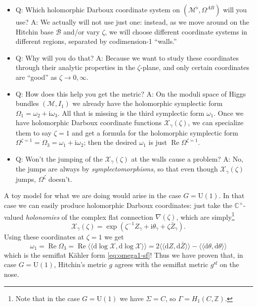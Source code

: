 \documentclass[12pt,letterpaper,reqno]{article}
\numberwithin{equation}{section}
\newcommand{\cB}{\ensuremath{\mathcal B}}
\newcommand{\cM}{\ensuremath{\mathcal M}}
\newcommand{\cX}{\ensuremath{\mathcal X}}
\newcommand{\C}{\ensuremath{\mathbb C}}
\newcommand{\Z}{\ensuremath{\mathbb Z}}
\newcommand{\kahler}{K\"ahler\xspace}
\newcommand{\I}{{\mathrm i}}
\newcommand{\de}{\mathrm{d}}
\renewcommand{\sf}{\mathrm{sf}}
\newcommand{\DIP}[1]{\langle\!\langle#1\rangle\!\rangle}
\newcommand{\ti}[1]{\textit{#1}}
\DeclareMathOperator{\re}{Re}
\newcommand{\U}{\mathrm{U}}
\newcommand{\insfig}[2]{

\medskip
\noindent
\begin{minipage}{\linewidth}

\makebox[\linewidth]{\texttt{[image: figures/\#1-crop.pdf]}}

\end{minipage}
\medskip

}
\begin{document}
\begin{itemize}
\item Q: Which holomorphic Darboux coordinate system on
$(\cM^\flat, \Omega^{AB})$ will you use? A: We actually
will not use just one: instead, as we move around on the
Hitchin base $\cB$ and/or vary $\zeta$, 
we will choose different coordinate
systems in different regions, separated by codimension-1 ``walls.''

\insfig{higgs-metric-6}{0.8}

\item Q: Why will you do that? A: Because we want to study
these coordinates through their analytic properties in the
$\zeta$-plane, and only certain coordinates are ``good''
as $\zeta \to 0, \infty$.


\item Q: How does this help you get the metric? A: On the
moduli space of Higgs bundles $(\cM, I_1)$ we 
already have the holomorphic
symplectic form $\Omega_1 = \omega_2 + \I \omega_3$. All that
is missing is the third symplectic form $\omega_1$.
Once we have holomorphic Darboux coordinate functions $\cX_\gamma(\zeta)$,
we can specialize them to say $\zeta = 1$ and get a formula
for the holomorphic symplectic form $\Omega^{\zeta = 1} = \Omega_3 = \omega_1 + \I \omega_2$; then the desired $\omega_1$ is just
$\re \Omega^{\zeta = 1}$.

\item Q: Won't the jumping of the $\cX_\gamma(\zeta)$ at the walls
cause a problem? A: No, the jumps are always by \ti{symplectomorphisms},
so that even though $\cX_\gamma(\zeta)$ jumps, $\Omega^\zeta$ doesn't.
\end{itemize}

A toy model for what we are doing would arise in the
case $G = \U(1)$. In that case we can easily produce holomorphic Darboux coordinates: 
just take the $\C^\times$-valued \ti{holonomies} of the 
complex flat connection $\nabla(\zeta)$, which are simply\footnote{Note that in the case
$G = \U(1)$ we have $\Sigma = C$, so $\Gamma = H_1(C,\Z)$.}
\begin{equation}
  \cX_\gamma(\zeta) = \exp \left( \zeta^{-1} Z_\gamma + \I \theta_\gamma + \zeta \bar Z_\gamma \right).
\end{equation}
Using these coordinates at $\zeta = 1$ we get
\begin{equation}
 \omega_1 = \re \Omega_3 = \re \DIP{\de \log \cX, \de \log \cX} = 2 \DIP{\de Z, \de \bar{Z}} - \DIP{\de \theta, \de \theta}
\end{equation}
which is the semiflat \kahler form \eqref{eq:omega1-sf}!
Thus we have proven that, in case $G = \U(1)$, Hitchin's metric $g$ agrees
with the semiflat metric $g^\sf$ on the nose.
\end{document}
